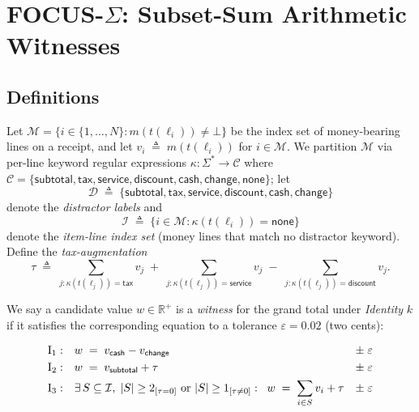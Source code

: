 
\section{FOCUS-$\Sigma$: Subset-Sum Arithmetic Witnesses}
\label{sec:focus_sigma}

\subsection{Definitions}
\label{sec:focus_sigma_defs}

Let $\mathcal{M} = \{i \in \{1,\dots,N\} : m(t(\ell_i)) \ne \bot\}$
be the index set of money-bearing lines on a receipt, and let
$v_i \;\triangleq\; m(t(\ell_i))$ for $i \in \mathcal{M}$.  We
partition $\mathcal{M}$ via per-line keyword regular expressions
$\kappa: \Sigma^* \to \mathcal{C}$ where
$\mathcal{C} = \{\textsf{subtotal}, \textsf{tax}, \textsf{service},
\textsf{discount}, \textsf{cash}, \textsf{change}, \textsf{none}\}$;
let
\[
\mathcal{D} \;\triangleq\; \{\textsf{subtotal}, \textsf{tax},
\textsf{service}, \textsf{discount}, \textsf{cash}, \textsf{change}\}
\]
denote the \emph{distractor labels} and
\[
\mathcal{I} \;\triangleq\; \{i \in \mathcal{M} : \kappa(t(\ell_i))
= \textsf{none}\}
\]
denote the \emph{item-line index set} (money lines that match no
distractor keyword).  Define the \emph{tax-augmentation}
\[
\tau \;\triangleq\; \sum_{j : \kappa(t(\ell_j))=\textsf{tax}} v_j
\;+\;\sum_{j : \kappa(t(\ell_j))=\textsf{service}} v_j
\;-\;\sum_{j : \kappa(t(\ell_j))=\textsf{discount}} v_j.
\]

\noindent
We say a candidate value $w \in \mathbb{R}^+$ is a \emph{witness} for
the grand total under \emph{Identity} $k$ if it satisfies the
corresponding equation to a tolerance $\varepsilon = 0.02$ (two
cents):

\begin{align}
\mathrm{I}_1: \quad &
w \;=\; v_{\textsf{cash}} - v_{\textsf{change}} & \pm\;\varepsilon \\
\mathrm{I}_2: \quad &
w \;=\; v_{\textsf{subtotal}} + \tau & \pm\;\varepsilon \\
\mathrm{I}_3: \quad &
\exists \, S \subseteq \mathcal{I},\;|S|\ge 2_{[\tau=0]}
\text{ or } |S|\ge 1_{[\tau\ne 0]} : \;\;
w \;=\; \sum_{i \in S} v_i + \tau & \pm\;\varepsilon \notag
\end{align}

